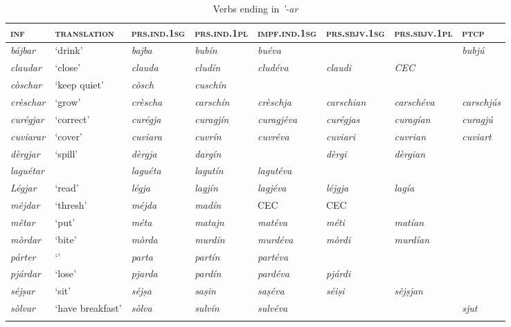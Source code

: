 \begin{sidewaystable} 
	\caption{Verbs ending in \textit{'-ar}}
	\label{stemaltvar}
	\begin{tabularx}{\textwidth}{llllllll} 
		\lsptoprule
		\textsc{\textbf{inf}} & \textsc{\textbf{translation}} & \textsc{\textbf{prs.ind.1sg}} & \textsc{\textbf{prs.ind.1pl}} & \textsc{\textbf{impf.ind.1sg}} & \textsc{\textbf{prs.sbjv.1sg}} & \textsc{\textbf{prs.sbjv.1pl}} & \textsc{\textbf{ptcp}}\\
		\midrule
		\textit{bájbar} & `drink' & \textit{bajba} & \textit{bubín} & \textit{buéva} & & & \textit{bubjú}\\
		\textit{claudar} & `close' & \textit{clauda} & \textit{cludín} & \textit{cludéva} & \textit{claudi} & \textit{CEC} & \textit{}\\
		\textit{còschar} & `keep quiet' & \textit{còsch} & \textit{cuschín} &  & & \textit{}\\
		\textit{crèschar} & `grow' & \textit{crèscha} & \textit{carschín} & \textit{crèschja} & \textit{carschian} & \textit{carschéva} & \textit{carschjús}\\
		\textit{curégjar} & `correct' & \textit{curégja} & \textit{curagjín} & \textit{curagjéva} & \textit{curégjas} & \textit{curagían} & \textit{curagjú}\\
		\textit{cuviarar} & `cover' & \textit{cuviara} & \textit{cuvrín} & \textit{cuvréva} & \textit{cuviari} & \textit{cuvrian} & \textit{cuviart}\\
		\textit{dèrgjar} & `spill' & \textit{dèrgja} & \textit{dargín} & \textit{} & \textit{dèrgi} & \textit{dèrgian}\\
		\textit{laguétar} & & \textit{laguéta} & \textit{lagutín} & \textit{lagutéva} & & & \textit{}\\
		\textit{Légjar} & `read' & \textit{légja} & \textit{lagjín} & \textit{lagjéva} & \textit{léjgja} & \textit{lagía} & \textit{}\\
		\textit{mêjdar} & `thresh' & \textit{méjda} & \textit{madín} & CEC & CEC & \textit{}\\
		\textit{mêtar} & `put' & \textit{méta} & \textit{matajn} & \textit{matéva} & \textit{méti} & \textit{matían} & \textit{}\\
		\textit{mòrdar} & `bite' & \textit{mòrda} & \textit{murdín} & \textit{murdéva} & \textit{mòrdi} & \textit{murdían} & \textit{ }\\
		\textit{párter} & `' & \textit{parta} & \textit{partín} & \textit{partéva} & & & \textit{}\\
		\textit{pjárdar} & `lose' & \textit{pjarda} & \textit{pardín} & \textit{pardéva} & \textit{pjárdi} & & \textit{}\\
		\textit{séjṣar} & `sit' & \textit{séjṣa}  &	\textit{saṣin} & \textit{saṣéva} & \textit{séiṣi} & \textit{sêjṣjan} & \textit{}\\
		\textit{sòlvar} & `have breakfast' & \textit{sòlva} & \textit{sulvín} & \textit{sulvéva} & \textit{} & \textit{} & \textit{sjut}\\
\lspbottomrule
\end{tabularx} 
\end{sidewaystable}


